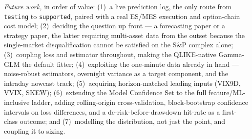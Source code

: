 \documentclass[12pt,a4paper]{article}
\begin{document}
\emph{Future work,} in order of value: (1)~a live prediction log, the only route from \texttt{testing}
to \texttt{supported}, paired with a real ES/MES execution and option-chain cost model; (2)~deciding the
question up front --- a forecasting paper or a strategy paper, the latter requiring multi-asset data
from the outset because the single-market disqualification cannot be satisfied on the S\&P complex
alone; (3)~coupling loss and estimator throughout, making the QLIKE-native Gamma-GLM the default fitter;
(4)~exploiting the one-minute data already in hand --- noise-robust estimators, overnight variance as a
target component, and the intraday nowcast track; (5)~acquiring horizon-matched leading inputs
(VIX9D, VVIX, SKEW); (6)~extending the Model Confidence Set to the full feature/ML-inclusive ladder,
adding rolling-origin cross-validation, block-bootstrap confidence intervals on loss differences, and a
de-risk-before-drawdown hit-rate as a first-class outcome; and (7)~modelling the distribution, not just
the point, and coupling it to sizing.

\end{document}
